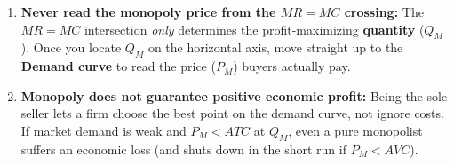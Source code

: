 \documentclass[11pt,letterpaper]{article}
\begin{document}
\begin{tcolorbox}[colback=CourseAmber!10!white,colframe=CourseOrange,title=\textbf{Clear It Up: Two Classic Monopoly Misconceptions}]
\begin{enumerate}
    \item \textbf{Never read the monopoly price from the $MR = MC$ crossing:} The $MR = MC$ intersection \emph{only} determines the profit-maximizing \textbf{quantity} ($Q_M$). Once you locate $Q_M$ on the horizontal axis, move straight up to the \textbf{Demand curve} to read the price ($P_M$) buyers actually pay.
    \item \textbf{Monopoly does not guarantee positive economic profit:} Being the sole seller lets a firm choose the best point on the demand curve, not ignore costs. If market demand is weak and $P_M < ATC$ at $Q_M$, even a pure monopolist suffers an economic loss (and shuts down in the short run if $P_M < AVC$).
\end{enumerate}
\end{tcolorbox}
\end{document}
